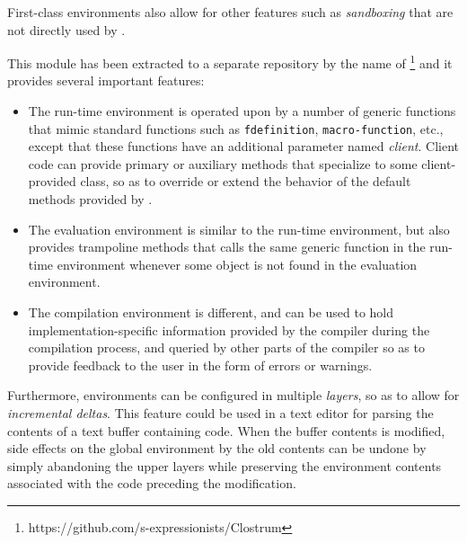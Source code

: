 First-class environments also allow for other features such as
\emph{sandboxing} that are not directly used by \sysname{}.

This module has been extracted to a separate repository by the name of
\clostrum{}%
\footnote{https://github.com/s-expressionists/Clostrum} and it
provides several important features:

\begin{itemize}
\item The run-time environment is operated upon by a number of generic
  functions that mimic standard \commonlisp{} functions such as
  \texttt{fdefinition}, \texttt{macro-function}, etc., except that
  these functions have an additional parameter named \emph{client}.
  Client code can provide primary or auxiliary methods that specialize
  to some client-provided class, so as to override or extend the
  behavior of the default methods provided by \clostrum{}.
\item The evaluation environment is similar to the run-time
  environment, but also provides trampoline methods that calls the
  same generic function in the run-time environment whenever some
  object is not found in the evaluation environment.
\item The compilation environment is different, and can be used to
  hold imple\-mentation-specific information provided by the compiler
  during the compilation process, and queried by other parts of the
  compiler so as to provide feedback to the user in the form of errors
  or warnings.
\end{itemize}

Furthermore, \clostrum{} environments can be configured in multiple
\emph{layers}, so as to allow for \emph{incremental deltas}.  This
feature could be used in a text editor for parsing the contents of a
text buffer containing \commonlisp{} code.  When the buffer contents
is modified, side effects on the global environment by the old
contents can be undone by simply abandoning the upper layers while
preserving the environment contents associated with the code preceding
the modification.
